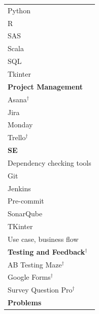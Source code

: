 \documentclass[11pt]{article}
\begin{document}
\begin{longtable}{@{}p{15cm}@{}}
\hspace*{4.5em}Python \\
\hspace*{4.5em}R \\
\hspace*{4.5em}SAS \\
\hspace*{4.5em}Scala \\
\hspace*{4.5em}SQL \\
\hspace*{4.5em}Tkinter \\
\hspace*{3.0em}\textbf{Project Management} \\
\hspace*{4.5em}Asana$^\dagger$ \\
\hspace*{4.5em}Jira \\
\hspace*{4.5em}Monday \\
\hspace*{4.5em}Trello$^\dagger$ \\
\hspace*{3.0em}\textbf{SE} \\
\hspace*{4.5em}Dependency checking tools \\
\hspace*{4.5em}Git \\
\hspace*{4.5em}Jenkins \\
\hspace*{4.5em}Pre-commit \\
\hspace*{4.5em}SonarQube \\
\hspace*{4.5em}TKinter \\
\hspace*{4.5em}Use case, business flow \\
\hspace*{3.0em}\textbf{Testing and Feedback}$^\dagger$ \\
\hspace*{4.5em}AB Testing Maze$^\dagger$ \\
\hspace*{4.5em}Google Forms$^\dagger$ \\
\hspace*{4.5em}Survey Question Pro$^\dagger$ \\
\hspace*{1.5em}\textbf{Problems} \\

\end{longtable}
\end{document}
